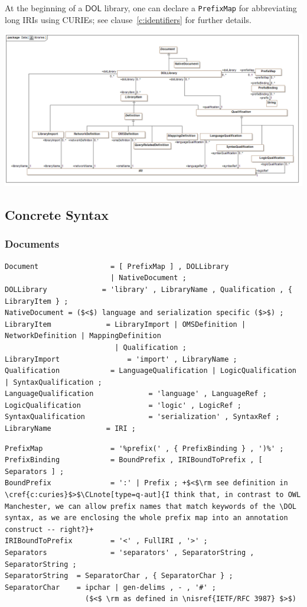 \documentclass[10pt,fleqn,final]{scrreprt}
\makeatletter
\newcommand{\cbs}[0]{\color{red}\xspace} %
\newcommand{\cbe}[0]{\color{black}\xspace} %
\newcommand*\CommentAuthor{}
\renewcommand*\CommentAuthor{#1}}
\newcommand*\CommentDate{}
\renewcommand*\CommentDate{#1}}
\newcommand*\CommentId{}
\renewcommand*\CommentId{#1}}
\newcommand*\CommentType{}
\renewcommand*\CommentType{#1}}
\newcommand*{\SetCommentColorByType}[1]{%
\edef\localType{{#1}}%
\expandafter\ifstrequal\localType{q-aut}{\colorlet{CommentColor}{red}}{%
\expandafter\ifstrequal\localType{q-all}{\colorlet{CommentColor}{orange}}{%
\expandafter\ifstrequal\localType{todo}{\colorlet{CommentColor}{orange}}{%
\expandafter\ifstrequal\localType{fyi}{\colorlet{CommentColor}{lightgray}}{%
\colorlet{CommentColor}{yellow}}}}}}
\newcommand*{\SetCommentPrefixByType}[1]{%
\edef\localType{{#1}}%
\expandafter\@ifmtarg\localType{%
\edef\CommentPrefix{}%
}{%
\caseupper[q]{#1}%
\edef\CommentPrefix{\thestring: }%
}}
\newcommand*{\initComment}[1]{%
\setkeys{Comment}{#1}%
\SetCommentColorByType{\CommentType}%
\relax%
\SetCommentPrefixByType{\CommentType}%
\relax%
}
\newcommand*{\todonote}[2][]{%
\initComment{#1}%
\pdfcomment[author=\CommentAuthor,color=CommentColor,date=\CommentDate,id=\CommentId]{%
\CommentPrefix
#2}}
\renewcommand*{\todonote}[2][]{%
\initComment{#1}%
\ednote{\CommentPrefix #2}}
\newcommand*{\CLnote}[2][author=Christoph Lange]{%
\todonote[author=Christoph Lange,#1]{#2} 
}
\newcommand*{\syntax}[1]{\texttt{#1}}
\newcommand*{\DOL}{\ensuremath{\mathsf{DOL}}\xspace}
\newcommand{\clauserefname}{clause}
\newcommand{\cref}[1]{\clauserefname~\ref{#1}}
\newcommand{\ssclause}[1]{\subsection{#1}}
\newcommand{\sssclause}[1]{\subsubsection{#1}}
\newcommand{\nisref}[1]{#1}
\newenvironment{definitions}[0]{\medskip }{}
\makeatother
\begin{document}
\begin{definitions}
At the beginning of a \DOL library, one can declare a \syntax{PrefixMap} for abbreviating long IRIs \cbs using CURIEs\cbe; see \cref{c:identifiers} for further details.

\medskip
\includegraphics[width=\textwidth]{mof/Class_Diagram__libraries.png}




\ssclause{Concrete Syntax}\label{c:libraries}

	\sssclause{Documents}
\begin{lstlisting}[language=ebnf,escapeinside={()},morecomment={[l]{\%\%\ }}]
Document                 = [ PrefixMap ] , DOLLibrary
                         | NativeDocument ;
DOLLibrary             = 'library' , LibraryName , Qualification , { LibraryItem } ;
NativeDocument = ($<$) language and serialization specific ($>$) ;
LibraryItem             = LibraryImport | OMSDefinition | NetworkDefinition | MappingDefinition 
                          | Qualification ;
LibraryImport                = 'import' , LibraryName ;
Qualification            = LanguageQualification | LogicQualification | SyntaxQualification ;
LanguageQualification             = 'language' , LanguageRef ;
LogicQualification                = 'logic' , LogicRef ;
SyntaxQualification               = 'serialization' , SyntaxRef ;
LibraryName             = IRI ;
\end{lstlisting}

\begin{lstlisting}[language=ebnf,escapechar=+,morecomment={[l]{\%\%\ }}]
PrefixMap                = '%prefix(' , { PrefixBinding } , ')%' ;
PrefixBinding            = BoundPrefix , IRIBoundToPrefix , [ Separators ] ;
BoundPrefix              = ':' | Prefix ; +$<$\rm see definition in \cref{c:curies}$>$\CLnote[type=q-aut]{I think that, in contrast to OWL Manchester, we can allow prefix names that match keywords of the \DOL syntax, as we are enclosing the whole prefix map into an annotation construct -- right?}+ 
IRIBoundToPrefix         = '<' , FullIRI , '>' ;
Separators               = 'separators' , SeparatorString , SeparatorString ;
SeparatorString  = SeparatorChar , { SeparatorChar } ;
SeparatorChar    = ipchar | gen-delims , - , '#' ;
                   ($<$ \rm as defined in \nisref{IETF/RFC 3987} $>$)


\end{lstlisting}
\end{definitions}
\end{document}
